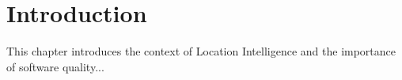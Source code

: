 \chapter{Introduction}
\label{chap:introduction}

This chapter introduces the context of Location Intelligence and the importance of software quality...
